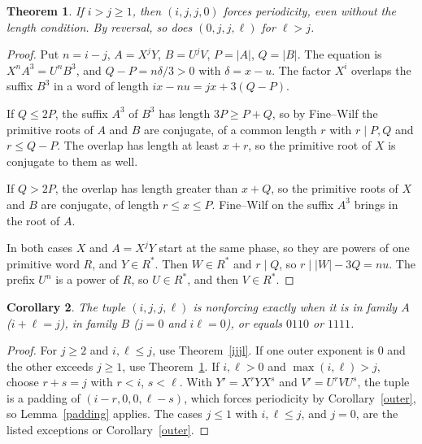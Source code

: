 \documentclass[10pt]{article}
\newtheorem{theorem}{Theorem}
\newtheorem{corollary}[theorem]{Corollary}
\theoremstyle{remark}\newtheorem*{remark}{Remark}
\begin{document}
\begin{theorem}\label{ijj0}
If \(i>j\ge1\), then \((i,j,j,0)\) forces periodicity, even without the length condition. By reversal, so does \((0,j,j,\ell)\) for \(\ell>j\).
\end{theorem}
\begin{proof}
Put \(n=i-j\), \(A=X^jY\), \(B=U^jV\), \(P=|A|\), \(Q=|B|\). The equation is \(X^nA^3=U^nB^3\), and \(Q-P=n\delta/3>0\) with \(\delta=x-u\). The factor \(X^i\) overlaps the suffix \(B^3\) in a word of length \(ix-nu=jx+3(Q-P)\).

If \(Q\le2P\), the suffix \(A^3\) of \(B^3\) has length \(3P\ge P+Q\), so by Fine--Wilf the primitive roots of \(A\) and \(B\) are conjugate, of a common length \(r\) with \(r\mid P,Q\) and \(r\le Q-P\). The overlap has length at least \(x+r\), so the primitive root of \(X\) is conjugate to them as well.

If \(Q>2P\), the overlap has length greater than \(x+Q\), so the primitive roots of \(X\) and \(B\) are conjugate, of length \(r\le x\le P\). Fine--Wilf on the suffix \(A^3\) brings in the root of \(A\).

In both cases \(X\) and \(A=X^jY\) start at the same phase, so they are powers of one primitive word \(R\), and \(Y\in R^*\). Then \(W\in R^*\) and \(r\mid Q\), so \(r\mid |W|-3Q=nu\). The prefix \(U^n\) is a power of \(R\), so \(U\in R^*\), and then \(V\in R^*\).
\end{proof}

\begin{corollary}\label{ijjlfull}
The tuple \((i,j,j,\ell)\) is nonforcing exactly when it is in family \(A\) (\(i+\ell=j\)), in family \(B\) (\(j=0\) and \(i\ell=0\)), or equals \(0110\) or \(1111\).
\end{corollary}
\begin{proof}
For \(j\ge2\) and \(i,\ell\le j\), use Theorem~\ref{ijjl}. If one outer exponent is \(0\) and the other exceeds \(j\ge1\), use Theorem~\ref{ijj0}. If \(i,\ell>0\) and \(\max(i,\ell)>j\), choose \(r+s=j\) with \(r<i\), \(s<\ell\). With \(Y'=X^rYX^s\) and \(V'=U^rVU^s\), the tuple is a padding of \((i-r,0,0,\ell-s)\), which forces periodicity by Corollary~\ref{outer}, so Lemma~\ref{padding} applies. The cases \(j\le1\) with \(i,\ell\le j\), and \(j=0\), are the listed exceptions or Corollary~\ref{outer}.
\end{proof}
\end{document}
